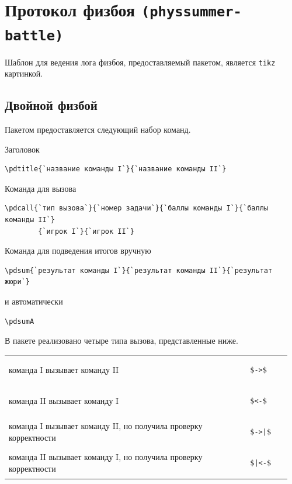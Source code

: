 \section{Протокол физбоя \texttt{(physsummer-battle)}}

Шаблон для ведения лога физбоя, предоставляемый пакетом, является \texttt{tikz} картинкой.

\subsection{Двойной физбой}

Пакетом предоставляется следующий набор команд.

Заголовок
\begin{lstlisting}[gobble = 3]
    \pdtitle{`название команды I`}{`название команды II`}
\end{lstlisting}
Команда для вызова
\begin{lstlisting}[gobble = 3]
    \pdcall{`тип вызова`}{`номер задачи`}{`баллы команды I`}{`баллы команды II`}
        {`игрок I`}{`игрок II`}
\end{lstlisting}
Команда для подведения итогов вручную
\begin{lstlisting}[gobble = 3]
    \pdsum{`результат команды I`}{`результат команды II`}{`результат жюри`}
\end{lstlisting}
и автоматически
\begin{lstlisting}[gobble = 3]
    \pdsumA
\end{lstlisting}



В пакете реализовано четыре типа вызова, представленные ниже.

\vspace{0.2cm}

\noindent
\begin{tabular}{S{0.82\linewidth} S{0.145\linewidth}}
    команда I вызывает команду II &
        \begin{lstlisting}[gobble = 7, keepspaces = \false]
            $->$
        \end{lstlisting} \\
    команда II вызывает команду I &
        \begin{lstlisting}[gobble = 7, keepspaces = \false]
            $<-$
        \end{lstlisting} \\
    команда I вызывает команду II, но получила проверку корректности &
        \begin{lstlisting}[gobble = 7, keepspaces = \false]
            $->|$
        \end{lstlisting} \\
    команда II вызывает команду I, но получила проверку корректности &
        \begin{lstlisting}[gobble = 7, keepspaces = \false]
            $|<-$
        \end{lstlisting}
\end{tabular}



